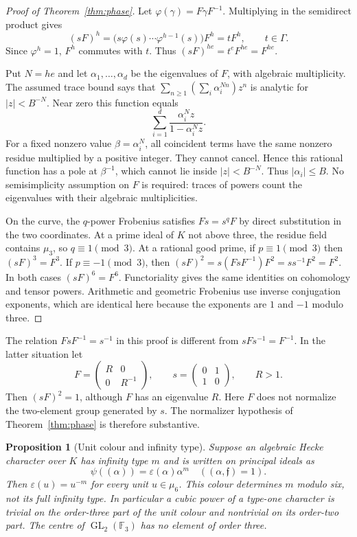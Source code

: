 \documentclass[11pt]{article}
\newtheorem{proposition}[theorem]{Proposition}
\theoremstyle{definition}
\theoremstyle{remark}
\begin{document}
\begin{proof}[Proof of Theorem~\ref{thm:phase}]
Let $\varphi(\gamma)=F\gamma F^{-1}$.  Multiplying in the semidirect
product gives
\[
 (sF)^h=\bigl(s\varphi(s)\cdots\varphi^{h-1}(s)\bigr)F^h=tF^h,
 \qquad t\in\Gamma.
\]
Since $\varphi^h=1$, $F^h$ commutes with $t$.  Thus
$(sF)^{he}=t^eF^{he}=F^{he}$.

Put $N=he$ and let $\alpha_1,\ldots,\alpha_d$ be the eigenvalues of
$F$, with algebraic multiplicity.  The assumed trace bound says that
$\sum_{n\geq1}(\sum_i\alpha_i^{Nn})z^n$ is analytic for
$|z|<B^{-N}$.  Near zero this function equals
\[
 \sum_{i=1}^d\frac{\alpha_i^Nz}{1-\alpha_i^Nz}.
\]
For a fixed nonzero value $\beta=\alpha_i^N$, all coincident terms have
the same nonzero residue multiplied by a positive integer.  They cannot
cancel.  Hence this rational function has a pole at $\beta^{-1}$, which
cannot lie inside $|z|<B^{-N}$.  Thus $|\alpha_i|\leq B$.
No semisimplicity assumption on $F$ is required: traces of powers count
the eigenvalues with their algebraic multiplicities.

On the curve, the $q$-power Frobenius satisfies
$F s=s^q F$ by direct substitution in the two coordinates.  At a prime
ideal of $K$ not above three, the residue field contains $\mu_3$, so
$q\equiv1\pmod3$.  At a rational good prime, if $p\equiv1\pmod3$ then
$(sF)^3=F^3$.  If $p\equiv-1\pmod3$, then
$(sF)^2=s(FsF^{-1})F^2=ss^{-1}F^2=F^2$.
In both cases $(sF)^6=F^6$.  Functoriality gives the same identities on
cohomology and tensor powers.  Arithmetic and geometric Frobenius use
inverse conjugation exponents, which are identical here because the
exponents are $1$ and $-1$ modulo three.
\end{proof}

The relation $FsF^{-1}=s^{-1}$ in this proof is different from
$sFs^{-1}=F^{-1}$.  In the latter situation let
\[
 F=\begin{pmatrix}R&0\\0&R^{-1}\end{pmatrix},\qquad
 s=\begin{pmatrix}0&1\\1&0\end{pmatrix},\qquad R>1.
\]
Then $(sF)^2=1$, although $F$ has an eigenvalue $R$.
Here $F$ does not normalize the two-element group generated by $s$.
The normalizer hypothesis of Theorem~\ref{thm:phase} is therefore
substantive.

\begin{proposition}[Unit colour and infinity type]\label{prop:colour}
Suppose an algebraic Hecke character over $K$ has infinity type $m$ and
is written on principal ideals as
\[
 \psi((\alpha))=\varepsilon(\alpha)\alpha^m
 \quad ((\alpha,\mathfrak f)=1).
\]
Then $\varepsilon(u)=u^{-m}$ for every unit $u\in\mu_6$.
This colour determines $m$ modulo six, not its full infinity type.
In particular a cubic power of a type-one character is trivial on the
order-three part of the unit colour and nontrivial on its order-two part.
The centre of $\operatorname{GL}_2(\mathbb F_3)$ has no element of
order three.
\end{proposition}
\end{document}

